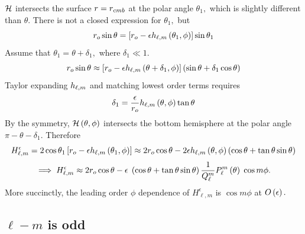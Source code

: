 $\mathcal{H}$ intersects the surface $r = { {r_{cmb}}}$ at the polar angle $\theta_{1},$ which is slightly different than $\theta.$ There is not a closed expression for $\theta_{1},$ but
\[r_{o}\sin\theta = \ls r_{o} - \epsilon\hLM\lb \theta_{1},\phi\rb \rs\sin\theta_{1} \]
Assume that $\theta_{1}=\theta + \delta_{1},$ where $\delta_{1} \ll1.$
\[
	r_{o}\sin\theta \approx\ls r_{o}-\epsilon \hLM\lb \theta + \delta_{1},\phi\rb \rs \lb \sin \theta+\delta_{1} \cos\theta\rb 
\] 
Taylor expanding $h_{\ell,m}$ and matching lowest order terms requires
\[\delta_{1} = \frac{\epsilon}{r_{o}}h_{\ell,m}\left ( \theta,\phi\right ) \tan \theta \]
By the symmetry, $\mathcal{H}\left ( \theta,\phi\right ) $ intersects the bottom hemisphere at the polar angle $\pi -\theta -\delta_{1}.$ Therefore
%
\[H_{\ell,m}^{\epsilon} = 2\cos \theta_{1}\ls r_{o} - \epsilon \hLM\lb \theta_{1},\phi\rb \rs \approx 2r_{o}\cos\theta -2\epsilon \hLM\lb \theta,\phi\rb \lb \cos\theta + \tan\theta \sin\theta\rb \]
%
\begin{equation}
	\implies H_{\ell,m}^{\epsilon}\approx 2r_{o}\cos\theta - \epsilon\; \left ( \cos\theta + \tan\theta\sin\theta\right ) \frac{1}{Q_{\ell}^{m}}P_{\ell}^{m}\left ( \theta\right )\;  \cos m\phi.
	\label{e:hg_even}
\end{equation}
More succinctly, the leading order $\phi$ dependence of $H_{\ell,m}^{\epsilon}$ is $\cos m\phi$ at $O\left ( \epsilon\right ) .$ 

\subsection*{$\ell - m$ is odd}

